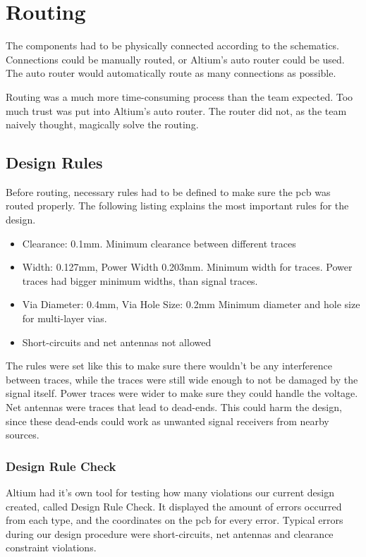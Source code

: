 \section{Routing}
The components had to be physically connected according to the schematics.
Connections could be manually routed, or Altium's auto router could be used.
The auto router would automatically route as many connections as possible.

Routing was a much more time-consuming process than the team expected.
Too much trust was put into Altium's auto router.
The router did not, as the team naively thought, magically solve the routing.

\subsection{Design Rules}
Before routing, necessary rules had to be defined to make sure the \gls{pcb} was routed properly.
The following listing explains the most important rules for the design.
\begin{itemize}
\item Clearance: 0.1mm.
\newline
Minimum clearance between different traces
\item Width: 0.127mm, Power Width 0.203mm.
\newline
Minimum width for traces.
Power traces had bigger minimum widths, than signal traces.
\item Via Diameter: 0.4mm, Via Hole Size: 0.2mm
\newline
Minimum diameter and hole size for multi-layer vias.
\item Short-circuits and net antennas not allowed
\end{itemize}

The rules were set like this to make sure there wouldn't be any interference between traces, while the traces were still wide enough to not be damaged by the signal itself.
Power traces were wider to make sure they could handle the voltage.
Net antennas were traces that lead to dead-ends.
This could harm the design, since these dead-ends could work as unwanted signal receivers from nearby sources.

\subsubsection{Design Rule Check}
Altium had it's own tool for testing how many violations our current design created, called Design Rule Check.
It displayed the amount of errors occurred from each type, and the coordinates on the \gls{pcb} for every error.
Typical errors during our design procedure were short-circuits, net antennas and clearance constraint violations.

